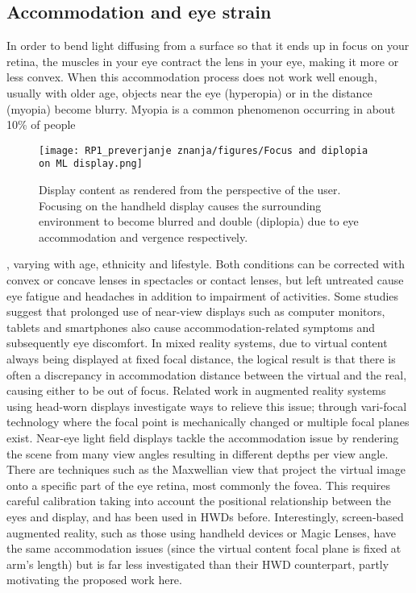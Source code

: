 \documentclass[preprint]{vgtc}               %
\begin{document}
\subsection{Accommodation and eye strain}
In order to bend light diffusing from a surface so that it ends up in
focus on your retina, the muscles in your eye contract the lens in
your eye, making it more or less convex. When this accommodation
process does not work well enough, usually with older age, objects
near the eye (hyperopia) or in the distance (myopia) become blurry.
Myopia is a common phenomenon occurring in about 10\% of people
\begin{figure}[h] %
    \centering
    \texttt{[image: RP1\_preverjanje znanja/figures/Focus and diplopia on ML display.png]}
    \caption{Display content as rendered from the perspective of the
user. Focusing on the handheld display causes the surrounding
environment to become blurred and double (diplopia) due to eye
accommodation and vergence respectively.}
    \label{fig:nemo}
\end{figure}
, varying with age, ethnicity and lifestyle. Both conditions can be
corrected with convex or concave lenses in spectacles or contact
lenses, but left untreated cause eye fatigue and headaches in addition
to impairment of activities. Some studies suggest that prolonged
use of near-view displays such as computer monitors, tablets and
smartphones also cause accommodation-related symptoms and subsequently
eye discomfort. In mixed reality systems, due to virtual
content always being displayed at fixed focal distance, the logical
result is that there is often a discrepancy in accommodation distance
between the virtual and the real, causing either to be out of focus. Related
work in augmented reality systems using head-worn displays
investigate ways to relieve this issue; through vari-focal technology
where the focal point is mechanically changed or multiple focal
planes exist. Near-eye light field displays tackle the accommodation
issue by rendering the scene from many view angles resulting in
different depths per view angle. There are techniques such as the
Maxwellian view that project the virtual image onto a specific part of
the eye retina, most commonly the fovea. This requires careful calibration
taking into account the positional relationship between the
eyes and display, and has been used in HWDs before. Interestingly,
screen-based augmented reality, such as those using handheld devices
or Magic Lenses, have the same accommodation issues (since
the virtual content focal plane is fixed at arm’s length) but is far
less investigated than their HWD counterpart, partly motivating the
proposed work here.
\newpage
\end{document}

